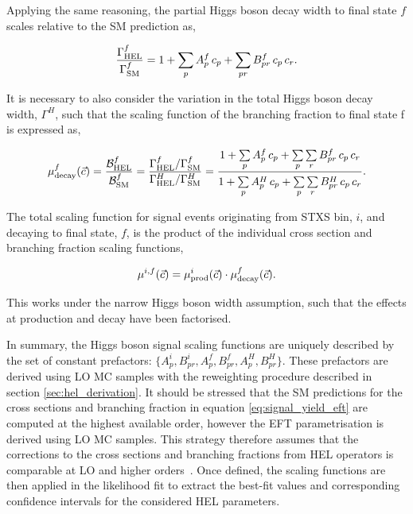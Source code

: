 Applying the same reasoning, the partial Higgs boson decay width to final state $f$ scales relative to the SM prediction as,

\begin{equation}
    \frac{\Gamma^f_{\rm{HEL}}}{\Gamma^f_{\rm{SM}}} = 1 + \sum_p A^f_p\,c_p + \sum_{pr} B^f_{pr}\,c_p\,c_r.
\end{equation}

\noindent
It is necessary to also consider the variation in the total Higgs boson decay width, $\Gamma^H$, such that the scaling function of the branching fraction to final state f is expressed as,

\begin{equation}
    \mu^f_{\rm{decay}}(\vec{c}) = \frac{\mathcal{B}^f_{\rm{HEL}}}{\mathcal{B}^f_{\rm{SM}}} = \frac{\Gamma^f_{\rm{HEL}}/\Gamma^f_{\rm{SM}}}{\Gamma^H_{\rm{HEL}}/\Gamma^H_{\rm{SM}}} = \frac{1 + \sum\limits_p A^f_p\,c_p + \sum\limits_p \sum\limits_r B^f_{pr}\,c_p\,c_r}{1 + \sum\limits^{~}_p A^H_p\,c_p + \sum\limits_p \sum\limits_r B^H_{pr}\,c_p\,c_r}.
\end{equation}

The total scaling function for signal events originating from STXS bin, $i$, and decaying to final state, $f$, is the product of the individual cross section and branching fraction scaling functions,

\begin{equation}
    \mu^{i,f}(\vec{c}) = \mu^i_{\rm{prod}}(\vec{c}) \cdot \mu^f_{\rm{decay}}(\vec{c}).
\end{equation}

\noindent
This works under the narrow Higgs boson width assumption, such that the effects at production and decay have been factorised.

In summary, the Higgs boson signal scaling functions are uniquely described by the set of constant prefactors: $\{A^i_p,B^i_{pr},A^f_p,B^f_{pr},A^{H}_p,B^{H}_{pr}\}$. These prefactors are derived using LO MC samples with the reweighting procedure described in section \ref{sec:hel_derivation}. It should be stressed that the SM predictions for the cross sections and branching fraction in equation \ref{eq:signal_yield_eft} are computed at the highest available order, however the EFT parametrisation is derived using LO MC samples. This strategy therefore assumes that the corrections to the cross sections and branching fractions from HEL operators is comparable at LO and higher orders~\cite{Degrande:2016dqg}. Once defined, the scaling functions are then applied in the likelihood fit to extract the best-fit values and corresponding confidence intervals for the considered HEL parameters. 


